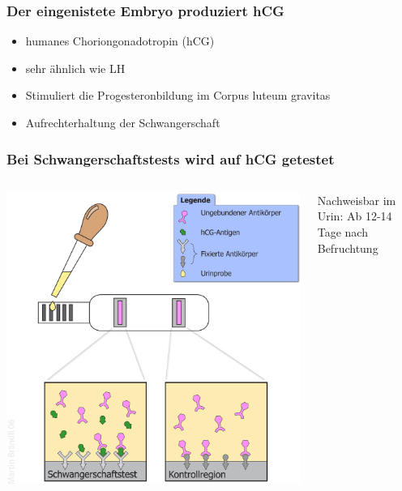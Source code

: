 \documentclass{beamer}
\begin{document}
\begin{frame}
\frametitle{Der  eingenistete Embryo produziert hCG}

\begin{itemize}
    \item 
    humanes Choriongonadotropin (hCG)
    \item 
    sehr ähnlich wie LH
    \item
    Stimuliert die Progesteronbildung im Corpus luteum gravitas
    \item
    Aufrechterhaltung der Schwangerschaft
    
\end{itemize}


\end{frame}


\begin{frame}
\frametitle{Bei Schwangerschaftstests wird auf hCG getestet}

\begin{columns}[c]



\begin{column}{5cm}
\includegraphics[width=\textwidth]{Schwangerschaftstest_Schema.png}
\end{column}


\begin{column}{5cm}

Nachweisbar im Urin: Ab 12-14 Tage nach Befruchtung

\pause



\end{column}

\end{columns}

\end{frame}
\end{document}
